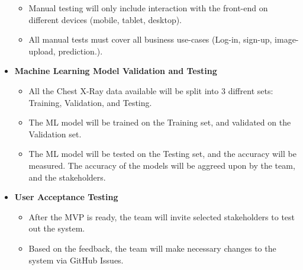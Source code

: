 \documentclass[12pt, titlepage]{article}
\begin{document}
\begin{itemize}
\begin{itemize}
    \item{Manual testing will only include interaction with the front-end on different devices (mobile, tablet, desktop).}
    \item{All manual tests must cover all business use-cases (Log-in, sign-up, image-upload, prediction.).}
  \end{itemize}
  \item[]{\textbf{Machine Learning Model Validation and Testing}}
  \begin{itemize}
    \item{All the Chest X-Ray data available will be split into 3 diffrent sets: Training, Validation, and Testing.}
    \item{The ML model will be trained on the Training set, and validated on the Validation set.}
    \item{The ML model will be tested on the Testing set, and the accuracy will be measured. The accuracy of the models will be aggreed upon by the team, and the stakeholders.}
  \end{itemize}
  \item[]{\textbf{User Acceptance Testing}}
  \begin{itemize}
    \item{After the MVP is ready, the team will invite selected stakeholders to test out the system.}
    \item{Based on the feedback, the team will make necessary changes to the system via GitHub Issues.}
  \end{itemize}
\end{itemize}
\end{document}
